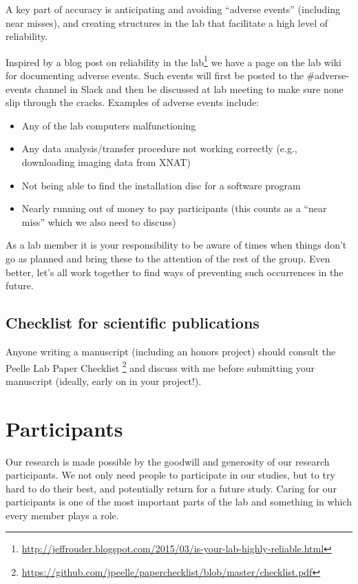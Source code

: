 \documentclass[letterpaper,12pt,oneside]{memoir}
\begin{document}
A key part of accuracy is anticipating and avoiding ``adverse events'' (including near misses), and creating structures in the lab that facilitate a high level of reliability.

Inspired by a blog post on reliability in the lab\footnote{\url{http://jeffrouder.blogspot.com/2015/03/is-your-lab-highly-reliable.html}} we have a page on the lab wiki for documenting adverse events. Such events will first be posted to the \#adverse-events channel in Slack and then be discussed at lab meeting to make sure none slip through the cracks. Examples of adverse events include:

\begin{itemize}
\item Any of the lab computers malfunctioning
\item Any data analysis/transfer procedure not working correctly (e.g., downloading imaging data from XNAT)
\item Not being able to find the installation disc for a software program
\item Nearly running out of money to pay participants (this counts as a ``near miss'' which we also need to discuss)
\end{itemize}

As a lab member it is your responsibility to be aware of times when things don't go as planned and bring these to the attention of the rest of the group. Even better, let's all work together to find ways of preventing such occurrences in the future.


\subsection{Checklist for scientific publications}

Anyone writing a manuscript (including an honors project) should consult the Peelle Lab Paper Checklist \footnote{\url{https://github.com/jpeelle/paperchecklist/blob/master/checklist.pdf}} and discuss with me before submitting your manuscript (ideally, early on in your project!).


\section{Participants}
\label{sec:participants}

Our research is made possible by the goodwill and generosity of our research participants. We not only need people to participate in our studies, but to try hard to do their best, and potentially return for a future study. Caring for our participants is one of the most important parts of the lab and something in which every member plays a role.
\end{document}
